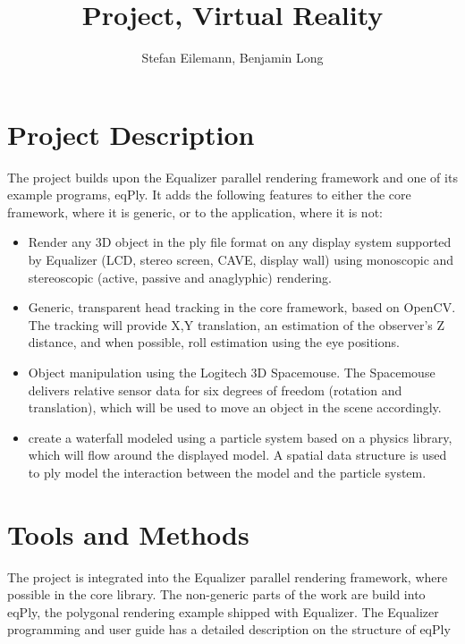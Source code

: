 \documentclass[10pt,a4]{scrartcl}
\title{Project, Virtual Reality}
\author{Stefan Eilemann, Benjamin Long}
\newcommand{\fix}[1]{\textbf{\color{red}{#1}}}
\begin{document}
\maketitle

\section{Project Description}

The project builds upon the Equalizer parallel rendering framework and one of
its example programs, eqPly. It adds the following features to either the
core framework, where it is generic, or to the application, where it is not:
\begin{itemize}
\item Render any 3D object in the ply file format on any display system
  supported by Equalizer (LCD, stereo screen, CAVE, display wall) using
  monoscopic and stereoscopic (active, passive and anaglyphic) rendering.
\item Generic, transparent head tracking in the core framework, based on
  OpenCV. The tracking will provide X,Y translation, an estimation of the
  observer's Z distance, and when possible, roll estimation using the eye
  positions.
\item Object manipulation using the Logitech 3D Spacemouse. The Spacemouse
  delivers relative sensor data for six degrees of freedom (rotation and
  translation), which will be used to move an object in the scene accordingly.
\item create a waterfall modeled using a particle system based on a physics
  library, which will flow around the displayed model. A spatial data structure
  is used to ply model the interaction between the model and the particle
  system.
\end{itemize}

\fix{screenshots}

\section{Tools and Methods}

The project is integrated into the Equalizer parallel rendering framework, where
possible in the core library. The non-generic parts of the work are build into
\textsf{eqPly}, the polygonal rendering example shipped with Equalizer. The
Equalizer programming and user guide has a detailed description on the structure
of \textsf{eqPly}
\end{document}
